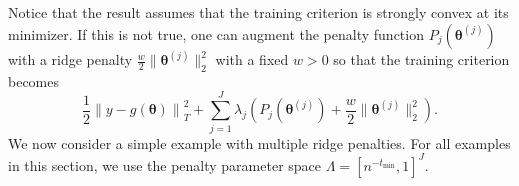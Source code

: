 \documentclass[12pt]{article} %
\theoremstyle{definition}
\begin{document}
Notice that the result assumes that the training criterion is strongly convex at its minimizer. If this is not true, one can augment the penalty function $P_j(\boldsymbol{\theta}^{(j)})$ with a ridge penalty $\frac{w}{2}\| \boldsymbol{\theta}^{(j)} \|_2^2$ with a fixed $w > 0$ so that the training criterion becomes
\begin{equation}
\label{eq:param_add_models_ridge}
\frac{1}{2} \left  \| y -  g(\boldsymbol{\theta}) \right \|^2_T 
+ \sum_{j=1}^J \lambda_j \left ( P_j(\boldsymbol{\theta}^{(j)}) + \frac{w}{2} \| \boldsymbol{\theta}^{(j)} \|^2_2 \right ).
\end{equation}
We now consider a simple example with multiple ridge penalties.
For all examples in this section, we use the penalty parameter space $\Lambda = \left [n^{- t_{\min}}, 1 \right ]^J$.
\end{document}
